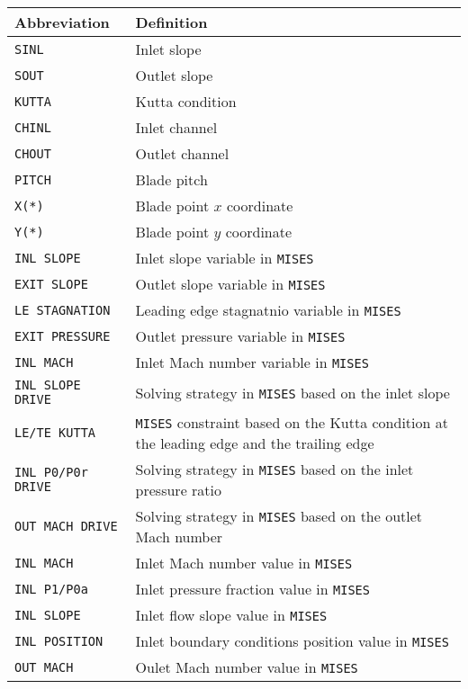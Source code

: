 \documentclass{config/polimiThesis}
\begin{document}
\begin{longtable}{p{2.5cm}p{8cm}}
    \hline
    Abbreviation & Definition \\
    \hline
    \texttt{SINL} & Inlet slope \\
    \texttt{SOUT} & Outlet slope \\ 
    \texttt{KUTTA} & Kutta condition \\ 
    \texttt{CHINL} & Inlet channel \\ 
    \texttt{CHOUT} & Outlet channel \\ 
    \texttt{PITCH} & Blade pitch \\ 
    \texttt{X(*)} & Blade point $x$ coordinate \\
    \texttt{Y(*)} & Blade point $y$ coordinate \\
    \texttt{INL SLOPE} & Inlet slope variable in \texttt{MISES} \\
    \texttt{EXIT SLOPE} & Outlet slope variable in \texttt{MISES} \\
    \texttt{LE STAGNATION} & Leading edge stagnatnio variable in \texttt{MISES} \\
    \texttt{EXIT PRESSURE} & Outlet pressure variable in \texttt{MISES} \\
    \texttt{INL MACH} & Inlet Mach number variable in \texttt{MISES} \\
    \texttt{INL SLOPE DRIVE} & Solving strategy in \texttt{MISES} based on the inlet slope \\
    \texttt{LE/TE KUTTA} & \texttt{MISES} constraint based on the Kutta condition at the leading edge and the trailing edge \\
    \texttt{INL P0/P0r DRIVE} & Solving strategy in \texttt{MISES} based on the inlet pressure ratio \\
    \texttt{OUT MACH DRIVE} & Solving strategy in \texttt{MISES} based on the outlet Mach number \\
    \texttt{INL MACH} & Inlet Mach number value in \texttt{MISES} \\ 
    \texttt{INL P1/P0a} & Inlet pressure fraction value in \texttt{MISES} \\
    \texttt{INL SLOPE} & Inlet flow slope value in \texttt{MISES} \\
    \texttt{INL POSITION} & Inlet boundary conditions position value in \texttt{MISES} \\   
    \texttt{OUT MACH} & Oulet Mach number value in \texttt{MISES} \\ 

\end{longtable}
\end{document}
